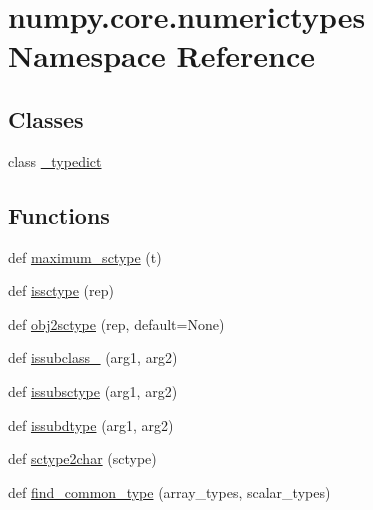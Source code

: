 \hypertarget{namespacenumpy_1_1core_1_1numerictypes}{}\section{numpy.\+core.\+numerictypes Namespace Reference}
\label{namespacenumpy_1_1core_1_1numerictypes}
\subsection*{Classes}
\begin{DoxyCompactItemize}
\item 
class \hyperlink{classnumpy_1_1core_1_1numerictypes_1_1__typedict}{\+\_\+typedict}
\end{DoxyCompactItemize}
\subsection*{Functions}
\begin{DoxyCompactItemize}
\item 
def \hyperlink{namespacenumpy_1_1core_1_1numerictypes_a97df80194c7466a06b95f037f0d5a844}{maximum\+\_\+sctype} (t)
\item 
def \hyperlink{namespacenumpy_1_1core_1_1numerictypes_ac0d06f07b4d9348f62cd776c5a4dfed1}{issctype} (rep)
\item 
def \hyperlink{namespacenumpy_1_1core_1_1numerictypes_a4112132097e16025a598ee650fdca003}{obj2sctype} (rep, default=None)
\item 
def \hyperlink{namespacenumpy_1_1core_1_1numerictypes_aabfb2145123e09bd184960c3f238b9db}{issubclass\+\_\+} (arg1, arg2)
\item 
def \hyperlink{namespacenumpy_1_1core_1_1numerictypes_a248957fb69c8b2fee6ecc1ef38266c88}{issubsctype} (arg1, arg2)
\item 
def \hyperlink{namespacenumpy_1_1core_1_1numerictypes_a42ed83d8a157a361cc678587b9c64ec3}{issubdtype} (arg1, arg2)
\item 
def \hyperlink{namespacenumpy_1_1core_1_1numerictypes_a0fc02b9c8ebbf34f43da02fd841e1e28}{sctype2char} (sctype)
\item 
def \hyperlink{namespacenumpy_1_1core_1_1numerictypes_a7a32e4cf109ee7b1a687ab3555e98898}{find\+\_\+common\+\_\+type} (array\+\_\+types, scalar\+\_\+types)
\end{DoxyCompactItemize}
